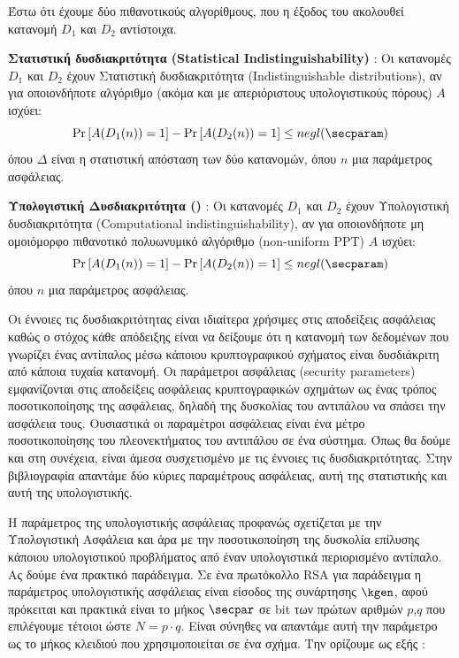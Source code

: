 Έστω ότι έχουμε δύο πιθανοτικούς αλγορίθμους, που η έξοδος του ακολουθεί κατανομή $D_1$ και $D_2$ αντίστοιχα.

\begin{definition}
\textbf{Στατιστική δυσδιακριτότητα (Statistical Indistinguishability)} : Οι κατανομές $D_1$ και $D_2$ έχουν Στατιστική δυσδιακριτότητα (Indistinguishable distributions), αν για οποιονδήποτε αλγόριθμο (ακόμα και με απεριόριστους υπολογιστικούς πόρους) $A$ ισχύει:
$$
\operatorname{Pr}\left[A(D_{1}(n))=1\right]-\operatorname{Pr}\left[A(D_{2}(n))=1\right] \leq negl(\secparam)
$$
όπου $Δ$ είναι η στατιστική απόσταση των δύο κατανομών, όπου $n$ μια παράμετρος ασφάλειας. 
\end{definition}

\begin{definition}
\textbf{Υπολογιστική Δυσδιακριτότητα ()} : Οι κατανομές $D_1$ και $D_2$ έχουν Υπολογιστική δυσδιακριτότητα (Computational indistinguishability), αν για οποιονδήποτε μη ομοιόμορφο πιθανοτικό πολυωνυμικό αλγόριθμο (non-uniform PPT) $A$ ισχύει:
$$
\operatorname{Pr}\left[A(D_{1}(n))=1\right]-\operatorname{Pr}\left[A(D_{2}(n))=1\right] \leq negl(\secparam)
$$
όπου $n$ μια παράμετρος ασφάλειας.
\end{definition}

Οι έννοιες τις δυσδιακριτότητας είναι ιδιαίτερα χρήσιμες στις αποδείξεις ασφάλειας καθώς ο στόχος κάθε απόδειξης είναι να δείξουμε ότι η κατανομή των δεδομένων που γνωρίζει ένας αντίπαλος μέσω κάποιου κρυπτογραφικού σχήματος είναι δυσδιάκριτη από κάποια τυχαία κατανομή.
Οι παράμετροι ασφάλειας (security parameters) εμφανίζονται στις αποδείξεις ασφάλειας κρυπτογραφικών σχημάτων ως ένας τρόπος ποσοτικοποίησης της ασφάλειας, δηλαδή της δυσκολίας του αντιπάλου να σπάσει την ασφάλεια τους. Ουσιαστικά οι παραμέτροι ασφάλειας είναι ένα μέτρο ποσοτικοποίησης του πλεονεκτήματος του αντιπάλου σε ένα σύστημα. Όπως θα δούμε και στη συνέχεια, είναι άμεσα συσχετισμένο με τις έννοιες τις δυσδιακριτότητας. Στην βιβλιογραφία απαντάμε δύο κύριες παραμέτρους ασφάλειας, αυτή της στατιστικής και αυτή της υπολογιστικής.
 
Η παράμετρος της υπολογιστικής ασφάλειας προφανώς σχετίζεται με την Υπολογιστική Ασφάλεια και άρα με την ποσοτικοποίηση της δυσκολία επίλυσης κάποιου υπολογιστικού προβλήματος από έναν υπολογιστικά περιορισμένο αντίπαλο. Ας δούμε ένα πρακτικό παράδειγμα. Σε ένα πρωτόκολλο RSA για παράδειγμα η παράμετρος υπολογιστικής ασφάλειας είναι είσοδος της συνάρτησης $\kgen$, αφού πρόκειται και πρακτικά είναι το μήκος $\secpar$ σε bit των πρώτων αριθμών $p$,$q$ που επιλέγουμε τέτοιοι ώστε $N=p \cdot q$. Είναι σύνηθες να απαντάμε αυτή την παράμετρο ως το μήκος κλειδιού που χρησιμοποιείται σε ένα σχήμα. Την ορίζουμε ως εξής :

